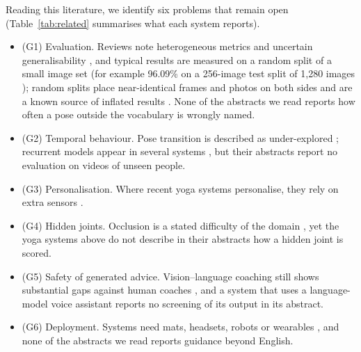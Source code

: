  Reading this literature, we identify six problems that remain open (Table~\ref{tab:related} summarises what each system reports).
\begin{itemize}\setlength{\itemsep}{1pt}\setlength{\topsep}{2pt}
\item (G1) Evaluation. Reviews note heterogeneous metrics and uncertain generalisability \cite{ozsezer2025review,koroglu2026review}, and typical results are measured on a random split of a small image set (for example 96.09\% on a 256-image test split of 1{,}280 images \cite{mohiuddin2025skeleton}); random splits place near-identical frames and photos on both sides and are a known source of inflated results \cite{kapoor2023leakage}. None of the abstracts we read reports how often a pose outside the vocabulary is wrongly named.
\item (G2) Temporal behaviour. Pose transition is described as under-explored \cite{dittakavi2025pose2pose}; recurrent models appear in several systems \cite{gadhvi2025posepilot,haldar2026framework}, but their abstracts report no evaluation on videos of unseen people.
\item (G3) Personalisation. Where recent yoga systems personalise, they rely on extra sensors \cite{vallabhaneni2026hybrid,saravanapandian2025mat}.
\item (G4) Hidden joints. Occlusion is a stated difficulty of the domain \cite{verma2020yoga82}, yet the yoga systems above do not describe in their abstracts how a hidden joint is scored.
\item (G5) Safety of generated advice. Vision--language coaching still shows substantial gaps against human coaches \cite{zuo2025formcoach}, and a system that uses a language-model voice assistant \cite{srinivasakumar2025yogavr} reports no screening of its output in its abstract.
\item (G6) Deployment. Systems need mats, headsets, robots or wearables \cite{kamble2026yogamat,saravanapandian2025mat,srinivasakumar2025yogavr,sathyapriya2026posture}, and none of the abstracts we read reports guidance beyond English.
\end{itemize}


